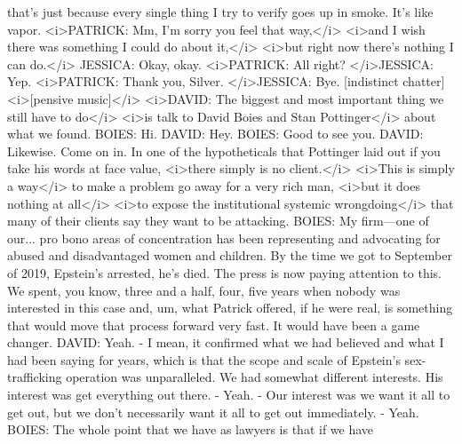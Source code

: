 \begin{itemize}
\begin{itemize}
    that's just because every single thing I try to verify goes up in
    smoke. It's like vapor. \textless{}i\textgreater{}PATRICK: Mm, I'm
    sorry you feel that way,\textless{}/i\textgreater{}
    \textless{}i\textgreater{}and I wish there was something I could do
    about it,\textless{}/i\textgreater{} \textless{}i\textgreater{}but
    right now there's nothing I can do.\textless{}/i\textgreater{}
    JESSICA: Okay, okay. \textless{}i\textgreater{}PATRICK: All right?
    \textless{}/i\textgreater{}JESSICA: Yep.
    \textless{}i\textgreater{}PATRICK: Thank you, Silver.
    \textless{}/i\textgreater{}JESSICA: Bye. {[}indistinct chatter{]}
    \textless{}i\textgreater{}{[}pensive
    music{]}\textless{}/i\textgreater{} \textless{}i\textgreater{}DAVID:
    The biggest and most important thing we still have to
    do\textless{}/i\textgreater{} \textless{}i\textgreater{}is talk to
    David Boies and Stan Pottinger\textless{}/i\textgreater{} about what
    we found. BOIES: Hi. DAVID: Hey. BOIES: Good to see you. DAVID:
    Likewise. Come on in. In one of the hypotheticals that Pottinger
    laid out if you take his words at face value,
    \textless{}i\textgreater{}there simply is no
    client.\textless{}/i\textgreater{} \textless{}i\textgreater{}This is
    simply a way\textless{}/i\textgreater{} to make a problem go away
    for a very rich man, \textless{}i\textgreater{}but it does nothing
    at all\textless{}/i\textgreater{} \textless{}i\textgreater{}to
    expose the institutional systemic
    wrongdoing\textless{}/i\textgreater{} that many of their clients say
    they want to be attacking. BOIES: My firm---one of our... pro bono
    areas of concentration has been representing and advocating for
    abused and disadvantaged women and children. By the time we got to
    September of 2019, Epstein's arrested, he's died. The press is now
    paying attention to this. We spent, you know, three and a half,
    four, five years when nobody was interested in this case and, um,
    what Patrick offered, if he were real, is something that would move
    that process forward very fast. It would have been a game changer.
    DAVID: Yeah. - I mean, it confirmed what we had believed and what I
    had been saying for years, which is that the scope and scale of
    Epstein's sex-trafficking operation was unparalleled. We had
    somewhat different interests. His interest was get everything out
    there. - Yeah. - Our interest was we want it all to get out, but we
    don't necessarily want it all to get out immediately. - Yeah. BOIES:
    The whole point that we have as lawyers is that if we have

\end{itemize}
\end{itemize}
